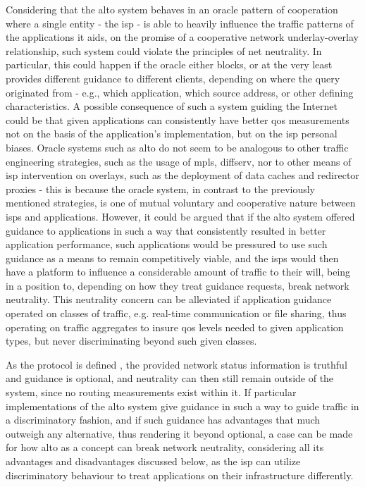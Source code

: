     Considering that the \gls{alto} system behaves in an oracle pattern of cooperation where a single entity - the \gls{isp} - is able to heavily influence the traffic patterns of the applications it aids, on the promise of a cooperative network underlay-overlay relationship, such system could violate the principles of net neutrality.
    In particular, this could happen if the oracle either blocks, or at the very least provides different guidance to different clients, depending on where the query originated from - e.g., which application, which source address, or other defining characteristics.
    A possible consequence of such a system guiding the Internet could be that given applications can consistently have better \gls{qos} measurements not on the basis of the application's implementation, but on the \gls{isp} personal biases.
    Oracle systems such as \gls{alto} do not seem to be analogous to other traffic engineering strategies, such as the usage of \gls{mpls}, \gls{diffserv}, nor to other means of \gls{isp} intervention on overlays, such as the deployment of data caches and redirector proxies - this is because the oracle system, in contrast to the previously mentioned strategies, is one of mutual voluntary and cooperative nature between \glspl{isp} and applications.
    However, it could be argued that if the \gls{alto} system offered guidance to applications in such a way that consistently resulted in better application performance, such applications would be pressured to use such guidance as a means to remain competitively viable, and the \glspl{isp} would then have a platform to influence a considerable amount of traffic to their will, being in a position to, depending on how they treat guidance requests, break network neutrality.
    This neutrality concern can be alleviated if application guidance operated on classes of traffic, e.g. real-time communication or file sharing, thus operating on traffic aggregates to insure \gls{qos} levels needed to given application types, but never discriminating beyond such given classes.

    As the protocol is defined \cite{alto-protocol}, the provided network status information is truthful and guidance is optional, and neutrality can then still remain outside of the system, since no routing measurements exist within it.
    If particular implementations of the \gls{alto} system give guidance in such a way to guide traffic in a discriminatory fashion, and if such guidance has advantages that much outweigh any alternative, thus rendering it beyond optional,  a case can be made for how \gls{alto} as a concept can break network neutrality, considering all its advantages and disadvantages discussed below, as the \gls{isp} can utilize discriminatory behaviour to treat applications on their infrastructure differently.

